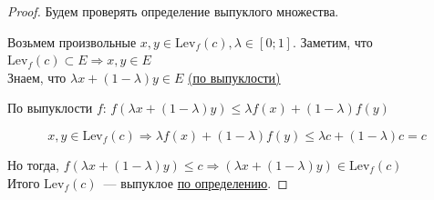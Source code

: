 

\begin{proof}
  Будем проверять определение выпуклого множества.

  Возьмем произвольные $x, y \in \mathrm{Lev}_f(c), \lambda \in [0;1]$.
  Заметим, что $\mathrm{Lev}_f(c) \subset E \Rightarrow x,y \in E$ \\
  Знаем, что $\lambda x + (1-\lambda) y \in E$ \hyperref[note:316B5BFA-8B9F-4267-9086-D6593AAB5F9B]{(по выпуклости)}

  По выпуклости $f$: $f(\lambda x + (1-\lambda)y) \le \lambda f(x) + (1-\lambda)f(y)$

  \[
  x,y \in \mathrm{Lev}_f(c) \Rightarrow \lambda f(x) + (1-\lambda)f(y) \le \lambda c + (1-\lambda)c = c
  \]

  Но тогда, $f(\lambda x + (1-\lambda)y) \le c \Rightarrow (\lambda x + (1-\lambda)y) \in \mathrm{Lev}_{f}(c)$ \\
  Итого $\mathrm{Lev}_f(c)$~--- выпуклое \hyperref[note:316B5BFA-8B9F-4267-9086-D6593AAB5F9B]{по определению}.
\end{proof}
